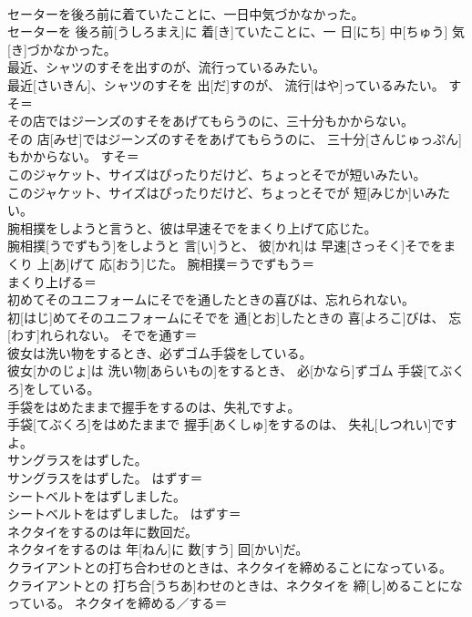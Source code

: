 \documentclass[8pt]{extreport}
\begin{document}
\begin{CJK}{UTF8}{min}
\\	セーターを後ろ前に着ていたことに、一日中気づかなかった。	
\\	セーターを 後ろ前[うしろまえ]に 着[き]ていたことに、一 日[にち] 中[ちゅう] 気[き]づかなかった。	
\\	最近、シャツのすそを出すのが、流行っているみたい。	
\\	最近[さいきん]、シャツのすそを 出[だ]すのが、 流行[はや]っているみたい。	すそ＝ 
\\	その店ではジーンズのすそをあげてもらうのに、三十分もかからない。	
\\	その 店[みせ]ではジーンズのすそをあげてもらうのに、 三十分[さんじゅっぷん]もかからない。	すそ＝ 
\\	このジャケット、サイズはぴったりだけど、ちょっとそでが短いみたい。	
\\	このジャケット、サイズはぴったりだけど、ちょっとそでが 短[みじか]いみたい。	
\\	腕相撲をしようと言うと、彼は早速そでをまくり上げて応じた。	
\\	腕相撲[うでずもう]をしようと 言[い]うと、 彼[かれ]は 早速[さっそく]そでをまくり 上[あ]げて 応[おう]じた。	腕相撲＝うでずもう＝ 
\\	まくり上げる＝ 
\\	初めてそのユニフォームにそでを通したときの喜びは、忘れられない。	
\\	初[はじ]めてそのユニフォームにそでを 通[とお]したときの 喜[よろこ]びは、 忘[わす]れられない。	そでを通す＝ 
\\	彼女は洗い物をするとき、必ずゴム手袋をしている。	
\\	彼女[かのじょ]は 洗い物[あらいもの]をするとき、 必[かなら]ずゴム 手袋[てぶくろ]をしている。	
\\	手袋をはめたままで握手をするのは、失礼ですよ。	
\\	手袋[てぶくろ]をはめたままで 握手[あくしゅ]をするのは、 失礼[しつれい]ですよ。	
\\	サングラスをはずした。	
\\	サングラスをはずした。	はずす＝ 
\\	シートベルトをはずしました。	
\\	シートベルトをはずしました。	はずす＝ 
\\	ネクタイをするのは年に数回だ。	
\\	ネクタイをするのは 年[ねん]に 数[すう] 回[かい]だ。	
\\	クライアントとの打ち合わせのときは、ネクタイを締めることになっている。	
\\	クライアントとの 打ち合[うちあ]わせのときは、ネクタイを 締[し]めることになっている。	ネクタイを締める／する＝ 

\end{CJK}
\end{document}
